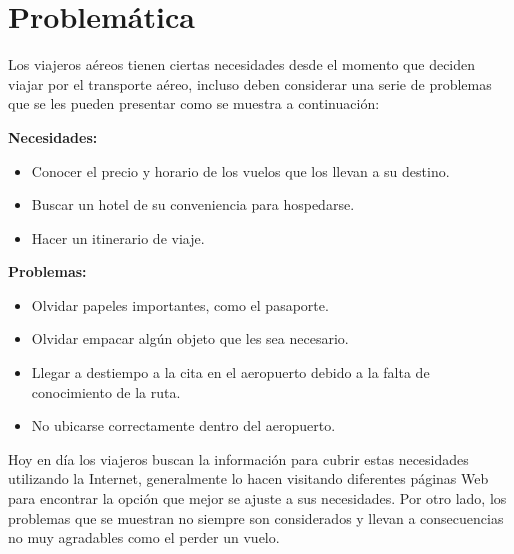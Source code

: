 \section{Problemática}

Los viajeros aéreos tienen ciertas necesidades desde el momento que deciden viajar por el transporte aéreo, incluso deben considerar una serie de problemas que se les pueden presentar como se muestra a continuación:

\textbf{Necesidades:}

\begin{itemize}
	\item Conocer el precio y horario de los vuelos que los llevan a su destino.
	\item Buscar un hotel de su conveniencia para hospedarse.
	\item Hacer un itinerario de viaje.
\end{itemize}

\textbf{Problemas:}

\begin{itemize}
	\item Olvidar papeles importantes, como el pasaporte.
	\item Olvidar empacar algún objeto que les sea necesario.
	\item Llegar a destiempo a la cita en el aeropuerto debido a la falta de conocimiento de la ruta.
	\item No ubicarse correctamente dentro del aeropuerto.
\end{itemize}

Hoy en día los viajeros buscan la información para cubrir estas necesidades utilizando la Internet,  generalmente lo hacen visitando diferentes páginas Web para encontrar la opción que mejor se ajuste a sus necesidades. Por otro lado, los problemas que se muestran no siempre son considerados y llevan a consecuencias no muy agradables como el perder un vuelo.